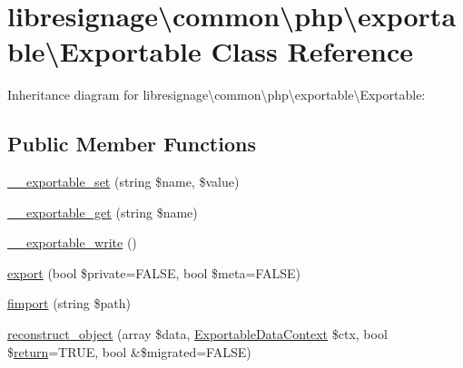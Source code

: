 \hypertarget{classlibresignage_1_1common_1_1php_1_1exportable_1_1Exportable}{}\section{libresignage\textbackslash{}common\textbackslash{}php\textbackslash{}exportable\textbackslash{}Exportable Class Reference}
\label{classlibresignage_1_1common_1_1php_1_1exportable_1_1Exportable}


Inheritance diagram for libresignage\textbackslash{}common\textbackslash{}php\textbackslash{}exportable\textbackslash{}Exportable\+:
\subsection*{Public Member Functions}
\begin{DoxyCompactItemize}
\item 
\hyperlink{classlibresignage_1_1common_1_1php_1_1exportable_1_1Exportable_ab3d5e9b1503d40a03f26ef2bbd874084}{\+\_\+\+\_\+exportable\+\_\+set} (string \$name, \$value)
\item 
\hyperlink{classlibresignage_1_1common_1_1php_1_1exportable_1_1Exportable_aa09cde1137746bef66aa3f63bdff65c3}{\+\_\+\+\_\+exportable\+\_\+get} (string \$name)
\item 
\hyperlink{classlibresignage_1_1common_1_1php_1_1exportable_1_1Exportable_a2433db67edaaf5f99ecfe419a8df4513}{\+\_\+\+\_\+exportable\+\_\+write} ()
\item 
\hyperlink{classlibresignage_1_1common_1_1php_1_1exportable_1_1Exportable_a67d20354893002d9e4243b20bd11c9b0}{export} (bool \$private=F\+A\+L\+SE, bool \$meta=F\+A\+L\+SE)
\item 
\hyperlink{classlibresignage_1_1common_1_1php_1_1exportable_1_1Exportable_ac9b48ee3a8ab096f8516d9af21e024b4}{fimport} (string \$path)
\item 
\hyperlink{classlibresignage_1_1common_1_1php_1_1exportable_1_1Exportable_a0152d567cc763286d968d06bce92a222}{reconstruct\+\_\+object} (array \$data, \hyperlink{classlibresignage_1_1common_1_1php_1_1exportable_1_1ExportableDataContext}{Exportable\+Data\+Context} \$ctx, bool \$\hyperlink{quota_200-default_8php_ae057f510746f2e7dcbd7d8ccfaf92a45}{return}=T\+R\+UE, bool \&\$migrated=F\+A\+L\+SE)
\end{DoxyCompactItemize}
